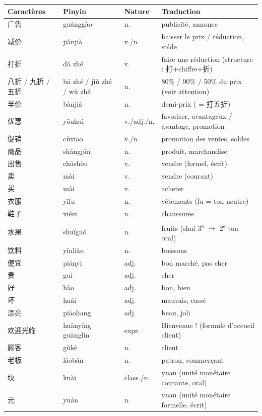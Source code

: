 \documentclass[11pt]{article}
\begin{document}
\begin{center}
\begin{tabularx}{\linewidth}{|X|X|X|X|}
\hline
\rowcolor{popblueL} \textbf{Caractères} & \textbf{Pinyin} & \textbf{Nature} & \textbf{Traduction} \\
\hline
广告 & guǎnggào & n. & publicité, annonce \\
\hline
减价 & jiǎnjià & v./n. & baisser le prix / réduction, solde \\
\hline
打折 & dǎ zhé & v. & faire une réduction (structure : 打+chiffre+折) \\
\hline
八折 / 九折 / 五折 & bā zhé / jiǔ zhé / wǔ zhé & n. & 80\% / 90\% / 50\% du prix (voir attention) \\
\hline
半价 & bànjià & n. & demi-prix ( = 打五折) \\
\hline
优惠 & yōuhuì & v./adj./n. & favoriser, avantageux / avantage, promotion \\
\hline
促销 & cùxiāo & v./n. & promotion des ventes, soldes \\
\hline
商品 & shāngpǐn & n. & produit, marchandise \\
\hline
出售 & chūshòu & v. & vendre (formel, écrit) \\
\hline
卖 & mài & v. & vendre (courant) \\
\hline
买 & mǎi & v. & acheter \\
\hline
衣服 & yīfu & n. & vêtements (fu = ton neutre) \\
\hline
鞋子 & xiézi & n. & chaussures \\
\hline
水果 & shuǐguǒ & n. & fruits (shuǐ 3\textsuperscript{e} $\rightarrow$ 2\textsuperscript{e} ton oral) \\
\hline
饮料 & yǐnliào & n. & boissons \\
\hline
便宜 & piányi & adj. & bon marché, pas cher \\
\hline
贵 & guì & adj. & cher \\
\hline
好 & hǎo & adj. & bon, bien \\
\hline
坏 & huài & adj. & mauvais, cassé \\
\hline
漂亮 & piàoliang & adj. & beau, joli \\
\hline
欢迎光临 & huānyíng guānglín & expr. & Bienvenue ! (formule d'accueil client) \\
\hline
顾客 & gùkè & n. & client \\
\hline
老板 & lǎobǎn & n. & patron, commerçant \\
\hline
块 & kuài & class./n. & yuan (unité monétaire courante, oral) \\
\hline
元 & yuán & n. & yuan (unité monétaire formelle, écrit) \\
\hline
\end{tabularx}
\end{center}
\end{document}
